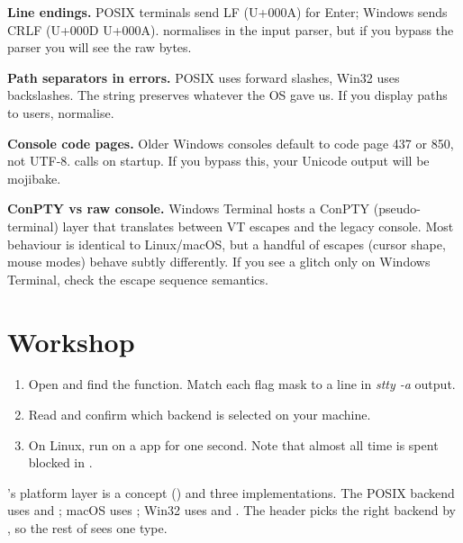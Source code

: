 \begin{warning}
\textbf{Line endings.} POSIX terminals send LF (U+000A) for
Enter; Windows sends CRLF (U+000D U+000A). \maya{} normalises in
the input parser, but if you bypass the parser you will see the
raw bytes.
\end{warning}

\begin{warning}
\textbf{Path separators in errors.} POSIX uses forward slashes,
Win32 uses backslashes. The  string
preserves whatever the OS gave us. If you display paths to users,
normalise.
\end{warning}

\begin{warning}
\textbf{Console code pages.} Older Windows consoles default to
code page 437 or 850, not UTF-8. \maya{} calls
 on startup. If you bypass
this, your Unicode output will be mojibake.
\end{warning}

\begin{warning}
\textbf{ConPTY vs raw console.} Windows Terminal hosts a
ConPTY (pseudo-terminal) layer that translates between VT
escapes and the legacy console. Most behaviour is identical to
Linux/macOS, but a handful of escapes (cursor shape, mouse
modes) behave subtly differently. If you see a glitch only on
Windows Terminal, check the escape sequence semantics.
\end{warning}

\section*{Workshop}

\begin{enumerate}[leftmargin=*]
  \item Open 
    and find the  function. Match each
    flag mask to a line in \emph{stty -a} output.
  \item Read  and
    confirm which backend is selected on your machine.
  \item On Linux, run 
    on a \maya{} app for one second. Note that almost all time
    is spent blocked in .
\end{enumerate}

\begin{recap}
\maya{}'s platform layer is a concept () and
three implementations. The POSIX backend uses  and
; macOS uses ; Win32 uses
 and . The
header  picks the right backend by
, so the rest of \maya{} sees one type.
\end{recap}
